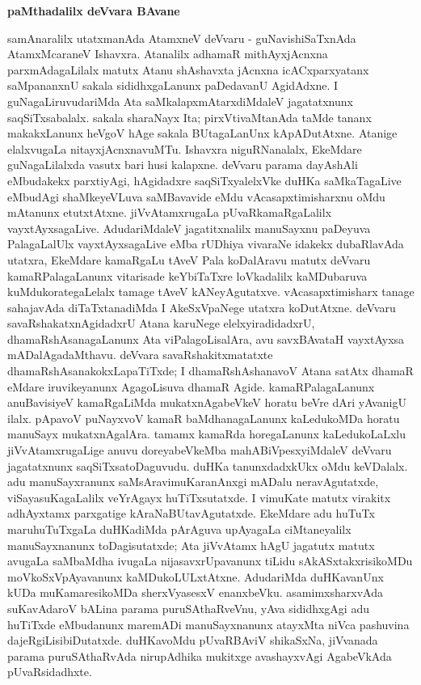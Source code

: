 \bigskip
\begin{center}
{\Large\bf paMthadalilx deVvara BAvane}
\end{center}

samAnaralilx utatxmanAda AtamxneV deVvaru - guNavishiSaTxnAda AtamxMcaraneV Ishavxra. Atanalilx adhamaR mithAyxjAcnxna parxmAdagaLilalx matutx Atanu shAshavxta jAcnxna icACxparxyatanx saMpananxnU sakala sididhxgaLanunx paDedavanU AgidAdxne. I guNagaLiruvudariMda Ata saMkalapxmAtarxdiMdaleV jagatatxnunx saqSiTxsabalalx. sakala sharaNayx Ita; pirxVtivaMtanAda taMde tananx makakxLanunx heVgoV hAge sakala BUtagaLanUnx kApADutAtxne. Atanige elalxvugaLa nitayxjAcnxnavuMTu. Ishavxra niguRNanalalx, EkeMdare guNagaLilalxda vasutx bari husi kalapxne. deVvaru parama dayAshAli eMbudakekx parxtiyAgi, hAgidadxre saqSiTxyalelxVke duHKa saMkaTagaLive eMbudAgi shaMkeyeVLuva saMBavavide eMdu vAcasapxtimisharxnu oMdu mAtanunx etutxtAtxne. jiVvAtamxrugaLa pUvaRkamaRgaLalilx vayxtAyxsagaLive. AdudariMdaleV jagatitxnalilx manuSayxnu paDeyuva PalagaLalUlx vayxtAyxsagaLive eMba rUDhiya vivaraNe idakekx dubaRlavAda utatxra, EkeMdare kamaRgaLu tAveV Pala koDalAravu matutx deVvaru kamaRPalagaLanunx vitarisade keYbiTaTxre loVkadalilx kaMDubaruva kuMdukorategaLelalx tamage tAveV kANeyAgutatxve. vAcasapxtimisharx tanage sahajavAda diTaTxtanadiMda I AkeSxVpaNege utatxra koDutAtxne. deVvaru savaRshakatxnAgidadxrU Atana karuNege elelxyiradidadxrU, dhamaRshAsanagaLanunx Ata viPalagoLisalAra, avu savxBAvataH vayxtAyxsa mADalAgadaMthavu. deVvara savaRshakitxmatatxte dhamaRshAsanakokxLapaTiTxde; I dhamaRshAshanavoV Atana satAtx dhamaR eMdare iruvikeyanunx AgagoLisuva dhamaR Agide. kamaRPalagaLanunx anuBavisiyeV kamaRgaLiMda mukatxnAgabeVkeV horatu beVre dAri yAvanigU ilalx. pApavoV puNayxvoV kamaR baMdhanagaLanunx kaLedukoMDa horatu manuSayx mukatxnAgalAra. tamamx kamaRda horegaLanunx kaLedukoLaLxlu jiVvAtamxrugaLige anuvu doreyabeVkeMba mahABiVpesxyiMdaleV deVvaru jagatatxnunx saqSiTxsatoDaguvudu. duHKa tanunxdadxkUkx oMdu keVDalalx. adu manuSayxranunx saMsAravimuKaranAnxgi mADalu neravAgutatxde, viSayasuKagaLalilx veYrAgayx huTiTxsutatxde. I vimuKate matutx virakitx adhAyxtamx parxgatige kAraNaBUtavAgutatxde. EkeMdare adu huTuTx maruhuTuTxgaLa duHKadiMda pArAguva upAyagaLa ciMtaneyalilx manuSayxnanunx toDagisutatxde; Ata jiVvAtamx hAgU jagatutx matutx avugaLa saMbaMdha ivugaLa nijasavxrUpavanunx tiLidu sAkASxtakxrisikoMDu moVkoSxVpAyavanunx kaMDukoLULxtAtxne. AdudariMda duHKavanUnx kUDa muKamaresikoMDa sherxVyasesxV enanxbeVku. asamimxsharxvAda suKavAdaroV bALina parama puruSAthaRveVnu, yAva sididhxgAgi adu huTiTxde eMbudanunx maremADi manuSayxnanunx atayxMta niVca pashuvina dajeRgiLisibiDutatxde. duHKavoMdu pUvaRBAviV shikaSxNa, jiVvanada parama puruSAthaRvAda nirupAdhika mukitxge avashayxvAgi AgabeVkAda pUvaRsidadhxte.

